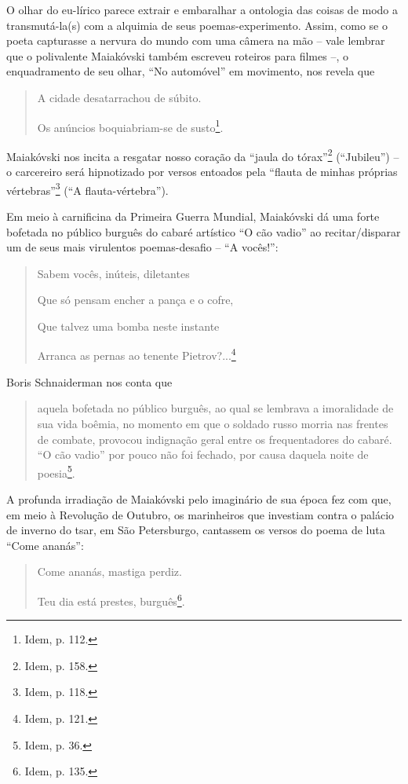 O olhar do eu-lírico parece extrair e embaralhar a ontologia das coisas
de modo a transmutá-la(s) com a alquimia de seus poemas-experimento.
Assim, como se o poeta capturasse a nervura do mundo com uma câmera na
mão -- vale lembrar que o polivalente Maiakóvski também escreveu
roteiros para filmes --, o enquadramento de seu olhar, ``No automóvel''
em movimento, nos revela que

\begin{quote}
A cidade desatarrachou de súbito.

Os anúncios boquiabriam-se de susto\footnote{Idem, p. 112.}.
\end{quote}

Maiakóvski nos incita a resgatar nosso coração da ``jaula do
tórax''\footnote{Idem, p. 158.} (``Jubileu'') -- o carcereiro será
hipnotizado por versos entoados pela ``flauta de minhas próprias
vértebras''\footnote{Idem, p. 118.} (``A flauta-vértebra'').

Em meio à carnificina da Primeira Guerra Mundial, Maiakóvski dá uma
forte bofetada no público burguês do cabaré artístico ``O cão vadio'' ao
recitar/disparar um de seus mais virulentos poemas-desafio -- ``A
vocês!'':

\begin{quote}
Sabem vocês, inúteis, diletantes

Que só pensam encher a pança e o cofre,

Que talvez uma bomba neste instante

Arranca as pernas ao tenente Pietrov?...\footnote{Idem, p. 121.}
\end{quote}

Boris Schnaiderman nos conta que

\begin{quote}
aquela bofetada no público burguês, ao qual se lembrava a imoralidade de
sua vida boêmia, no momento em que o soldado russo morria nas frentes de
combate, provocou indignação geral entre os frequentadores do cabaré.
``O cão vadio'' por pouco não foi fechado, por causa daquela noite de
poesia\footnote{Idem, p. 36.}.
\end{quote}

A profunda irradiação de Maiakóvski pelo imaginário de sua época fez com
que, em meio à Revolução de Outubro, os marinheiros que investiam contra
o palácio de inverno do tsar, em São Petersburgo, cantassem os versos do
poema de luta ``Come ananás'':

\begin{quote}
Come ananás, mastiga perdiz.

Teu dia está prestes, burguês\footnote{Idem, p. 135.}.
\end{quote}


